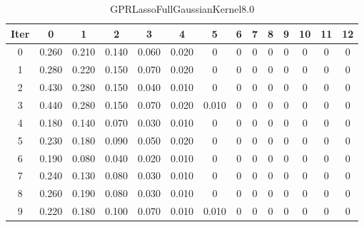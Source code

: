 \begin{table}
	\begin{center}
		\begin{tabular}{|c|c|c|c|c|c|c|c|c|c|c|c|c|c|}
			\hline
			Iter & 0 & 1 & 2 & 3 & 4 & 5 & 6 & 7 & 8 & 9 & 10 & 11 & 12 \\
			\hline
			0 & 0.260 & 0.210 & 0.140 & 0.060 & 0.020 & 0 & 0 & 0 & 0 & 0 & 0 & 0 & 0 \\
			\hline
			1 & 0.280 & 0.220 & 0.150 & 0.070 & 0.020 & 0 & 0 & 0 & 0 & 0 & 0 & 0 & 0 \\
			\hline
			2 & 0.430 & 0.280 & 0.150 & 0.040 & 0.010 & 0 & 0 & 0 & 0 & 0 & 0 & 0 & 0 \\
			\hline
			3 & 0.440 & 0.280 & 0.150 & 0.070 & 0.020 & 0.010 & 0 & 0 & 0 & 0 & 0 & 0 & 0 \\
			\hline
			4 & 0.180 & 0.140 & 0.070 & 0.030 & 0.010 & 0 & 0 & 0 & 0 & 0 & 0 & 0 & 0 \\
			\hline
			5 & 0.230 & 0.180 & 0.090 & 0.050 & 0.020 & 0 & 0 & 0 & 0 & 0 & 0 & 0 & 0 \\
			\hline
			6 & 0.190 & 0.080 & 0.040 & 0.020 & 0.010 & 0 & 0 & 0 & 0 & 0 & 0 & 0 & 0 \\
			\hline
			7 & 0.240 & 0.130 & 0.080 & 0.030 & 0.010 & 0 & 0 & 0 & 0 & 0 & 0 & 0 & 0 \\
			\hline
			8 & 0.260 & 0.190 & 0.080 & 0.030 & 0.010 & 0 & 0 & 0 & 0 & 0 & 0 & 0 & 0 \\
			\hline
			9 & 0.220 & 0.180 & 0.100 & 0.070 & 0.010 & 0.010 & 0 & 0 & 0 & 0 & 0 & 0 & 0 \\
			\hline
		\end{tabular}
	\end{center}
	\caption{GPRLassoFullGaussianKernel8.0}
\end{table}